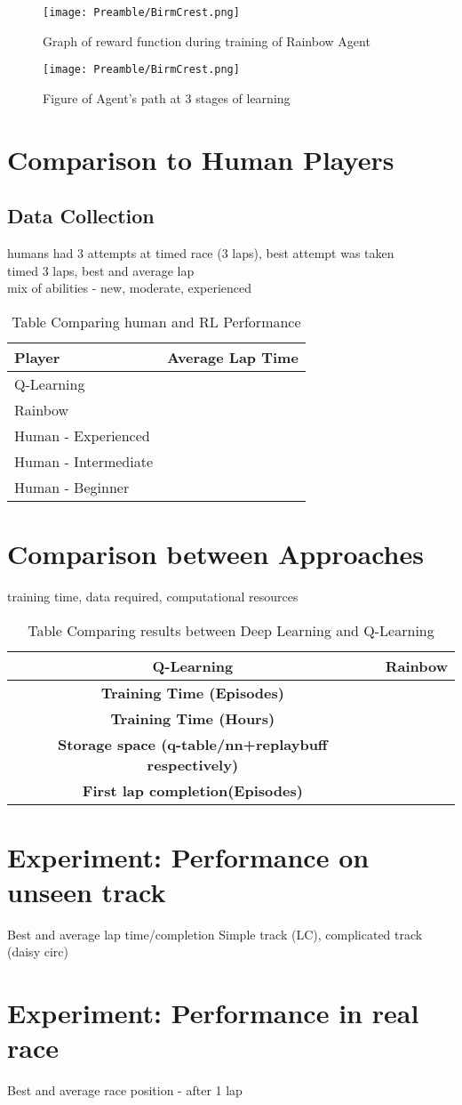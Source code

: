 \begin{figure}
    \centering
    \texttt{[image: Preamble/BirmCrest.png]}
    \caption{Graph of reward function during training of Rainbow Agent}
    \label{fig:trainig-reward-deep}
\end{figure}

\begin{figure}
    \centering
    \texttt{[image: Preamble/BirmCrest.png]}
    \caption{Figure of Agent's path at 3 stages of learning}
    \label{fig:agent-path-q}
\end{figure}

\section{Comparison to Human Players}
\subsection{Data Collection}
humans had 3 attempts at timed race (3 laps), best attempt was taken\\ timed 3 laps, best and average lap
\\ mix of abilities - new, moderate, experienced

\begin{table}[h]
    \centering
    \begin{tabular}{l|l}
    \textbf{Player} & \textbf{Average Lap Time}\\
    \hline
    Q-Learning    &  \\
    Rainbow & \\
    Human - Experienced & \\
    Human - Intermediate & \\
    Human - Beginner &  
    \end{tabular}
    \caption{Table Comparing human and RL Performance}
    \label{tab:lap-times}
\end{table}
\section{Comparison between Approaches}
training time, data required, computational resources
\begin{table}[h]
    \centering
    \begin{tabular}{c|l}
    \textbf{Q-Learning} & \textbf{Rainbow}\\
    \hline
    \textbf{Training Time (Episodes)}     &  \\
    \textbf{Training Time (Hours)}     &  \\
    \textbf{Storage space (q-table/nn+replaybuff respectively)}     &  \\
    \textbf{First lap completion(Episodes)}     &  \\
    \end{tabular}
    \caption{Table Comparing results between Deep Learning and Q-Learning}
    \label{tab:rl-comparison}
\end{table}

\section{Experiment: Performance on unseen track}
Best and average lap time/completion
Simple track (LC), complicated track (daisy circ)
\section{Experiment: Performance in real race}
Best and average race position - after 1 lap